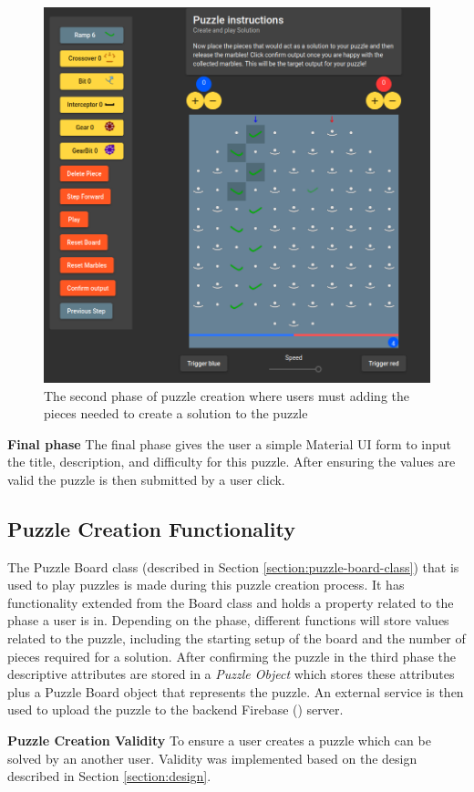 \documentclass{l4proj}
\begin{document}
\begin{figure}
    \centering
    \includegraphics[width=0.65\linewidth]{images/puzzleCreation.png}
    \caption{The second phase of puzzle creation where users must adding the pieces needed to create a solution to the puzzle}
    \label{fig:puzzleCreation}
\end{figure}

\textbf{Final phase}
The final phase gives the user a simple Material UI form to input the title, description, and difficulty for this puzzle. After ensuring the values are valid the puzzle is then submitted by a user click.

\subsection{Puzzle Creation Functionality}
The Puzzle Board class (described in Section \ref{section:puzzle-board-class}) that is used to play puzzles is made during this puzzle creation process. It has functionality extended from the Board class and holds a property related to the phase a user is in. Depending on the phase, different functions will store values related to the puzzle, including the starting setup of the board and the number of pieces required for a solution. After confirming the puzzle in the third phase the descriptive attributes are stored in a \emph{Puzzle Object} which stores these attributes plus a Puzzle Board object that represents the puzzle. An external service is then used to upload the puzzle to the backend Firebase (\cite{firebase}) server.

\textbf{Puzzle Creation Validity}
To ensure a user creates a puzzle which can be solved by an another user. Validity was implemented based on the design described in Section \ref{section:design}.
\end{document}
